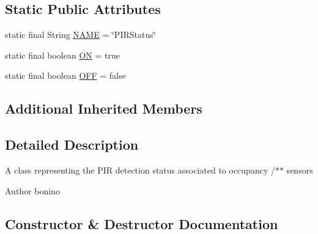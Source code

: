 \subsection*{Static Public Attributes}
\begin{DoxyCompactItemize}
\item 
static final String \hyperlink{classit_1_1polito_1_1elite_1_1enocean_1_1enj_1_1eep_1_1eep26_1_1attributes_1_1_e_e_p26_p_i_r_status_a280189dff80af3490df81310a931123c}{N\+A\+ME} = \char`\"{}P\+I\+R\+Status\char`\"{}
\item 
static final boolean \hyperlink{classit_1_1polito_1_1elite_1_1enocean_1_1enj_1_1eep_1_1eep26_1_1attributes_1_1_e_e_p26_p_i_r_status_a025527df852ed25d2908f71099646cd4}{ON} = true
\item 
static final boolean \hyperlink{classit_1_1polito_1_1elite_1_1enocean_1_1enj_1_1eep_1_1eep26_1_1attributes_1_1_e_e_p26_p_i_r_status_a21aa199586b981c0979a720a6d89b12c}{O\+FF} = false
\end{DoxyCompactItemize}
\subsection*{Additional Inherited Members}


\subsection{Detailed Description}
A class representing the P\+IR detection status associated to occupancy /$\ast$$\ast$ sensors \begin{DoxyAuthor}{Author}
bonino 
\end{DoxyAuthor}


\subsection{Constructor \& Destructor Documentation}
\hypertarget{classit_1_1polito_1_1elite_1_1enocean_1_1enj_1_1eep_1_1eep26_1_1attributes_1_1_e_e_p26_p_i_r_status_af43fdb1552684378ba338e0448344782}{}\label{classit_1_1polito_1_1elite_1_1enocean_1_1enj_1_1eep_1_1eep26_1_1attributes_1_1_e_e_p26_p_i_r_status_af43fdb1552684378ba338e0448344782} 
